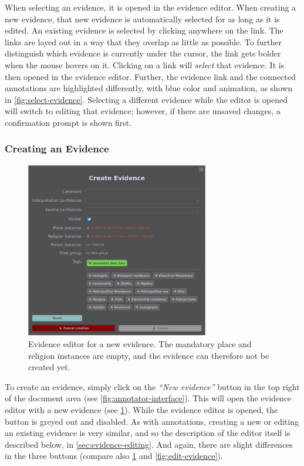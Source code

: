 When selecting an evidence, it is opened in the evidence editor.
When creating a new evidence, that new evidence is automatically selected for as long as it is edited.
An existing evidence is selected by clicking anywhere on the link.
The links are layed out in a way that they overlap as little as possible.
To further distinguish which evidence is currently under the cursor, the link gets bolder when the mouse hovers on it.
Clicking on a link will \emph{select} that evidence.
It is then opened in the evidence editor.
Further, the evidence link and the connected annotations are highlighted differently, with blue color and animation, as shown in \cref{fig:select-evidence}.
Selecting a different evidence while the editor is opened will switch to editing that evidence;
however, if there are unsaved changes, a confirmation prompt is shown first.


\subsubsection{Creating an Evidence}
\label{sec:evidence-creation}

\begin{figure}[htb]
  \centering
  \includegraphics[width=8cm]{../src/assets/annotator-documentation/create-evidence.png}

  \caption{
    Evidence editor for a new evidence.
    The mandatory place and religion instances are empty, and the evidence can therefore not be created yet.
  }
  \label{fig:create-evidence}
\end{figure}

To create an evidence, simply click on the \emph{\enquote{New evidence}} button in the top right of the document area (see \cref{fig:annotator-interface}).
This will open the evidence editor with a new evidence (see \cref{fig:create-evidence}).
While the evidence editor is opened, the button is greyed out and disabled.
As with annotations, creating a new or editing an existing evidence is very similar, and so the description of the editor itself is described below, in \cref{sec:evidence-editing}.
And again, there are slight differences in the three buttons (compare also \cref{fig:create-evidence} and \cref{fig:edit-evidence}).

